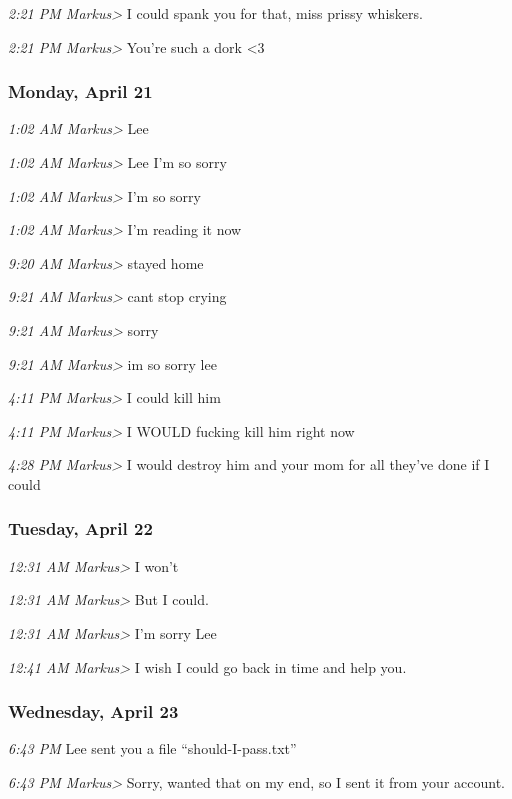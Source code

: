 {\emph{2:21 PM Markus\textgreater{}} I could spank you for that, miss
prissy whiskers.

\emph{2:21 PM Markus\textgreater{}} You're such a dork \textless{}3

\subsubsection*{Monday, April 21}\label{monday-april-21}

\emph{1:02 AM Markus\textgreater{}} Lee

\emph{1:02 AM Markus\textgreater{}} Lee I'm so sorry

\emph{1:02 AM Markus\textgreater{}} I'm so sorry

\emph{1:02 AM Markus\textgreater{}} I'm reading it now

\emph{9:20 AM Markus\textgreater{}} stayed home

\emph{9:21 AM Markus\textgreater{}} cant stop crying

\emph{9:21 AM Markus\textgreater{}} sorry

\emph{9:21 AM Markus\textgreater{}} im so sorry lee

\emph{4:11 PM Markus\textgreater{}} I could kill him

\emph{4:11 PM Markus\textgreater{}} I WOULD fucking kill him right now

\emph{4:28 PM Markus\textgreater{}} I would destroy him and your mom for
all they've done if I could

\subsubsection*{Tuesday, April 22}\label{tuesday-april-22}

\emph{12:31 AM Markus\textgreater{}} I won't

\emph{12:31 AM Markus\textgreater{}} But I could.

\emph{12:31 AM Markus\textgreater{}} I'm sorry Lee

\emph{12:41 AM Markus\textgreater{}} I wish I could go back in time and
help you.

\subsubsection*{Wednesday, April 23}\label{wednesday-april-23}

\emph{6:43 PM} Lee sent you a file ``should-I-pass.txt''

\emph{6:43 PM Markus\textgreater{}} Sorry, wanted that on my end, so I
sent it from your account.

}
